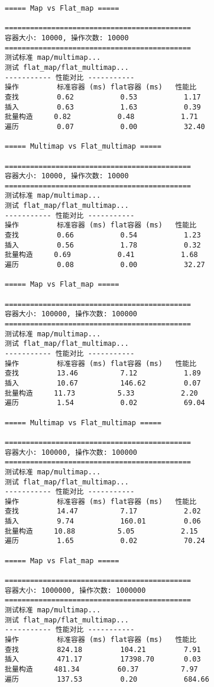 \documentclass[a4paper, 12pt]{article}
\begin{document}
\begin{lstlisting}[style=cpp]
===== Map vs Flat_map =====

============================================
容器大小: 10000, 操作次数: 10000
============================================
测试标准 map/multimap...
测试 flat_map/flat_multimap...
----------- 性能对比 -----------
操作         标准容器 (ms) flat容器 (ms)   性能比
查找         0.62           0.53           1.17
插入         0.63           1.63           0.39
批量构造     0.82           0.48           1.71
遍历         0.07           0.00           32.40

===== Multimap vs Flat_multimap =====

============================================
容器大小: 10000, 操作次数: 10000
============================================
测试标准 map/multimap...
测试 flat_map/flat_multimap...
----------- 性能对比 -----------
操作         标准容器 (ms) flat容器 (ms)   性能比
查找         0.66           0.54           1.23
插入         0.56           1.78           0.32
批量构造     0.69           0.41           1.68
遍历         0.08           0.00           32.27

===== Map vs Flat_map =====

============================================
容器大小: 100000, 操作次数: 100000
============================================
测试标准 map/multimap...
测试 flat_map/flat_multimap...
----------- 性能对比 -----------
操作         标准容器 (ms) flat容器 (ms)   性能比
查找         13.46          7.12           1.89
插入         10.67          146.62         0.07
批量构造     11.73          5.33           2.20
遍历         1.54           0.02           69.04

===== Multimap vs Flat_multimap =====

============================================
容器大小: 100000, 操作次数: 100000
============================================
测试标准 map/multimap...
测试 flat_map/flat_multimap...
----------- 性能对比 -----------
操作         标准容器 (ms) flat容器 (ms)   性能比
查找         14.47          7.17           2.02
插入         9.74           160.01         0.06
批量构造     10.88          5.05           2.15
遍历         1.65           0.02           70.24

===== Map vs Flat_map =====

============================================
容器大小: 1000000, 操作次数: 1000000
============================================
测试标准 map/multimap...
测试 flat_map/flat_multimap...
----------- 性能对比 -----------
操作         标准容器 (ms) flat容器 (ms)   性能比
查找         824.18         104.21         7.91
插入         471.17         17398.70       0.03
批量构造     481.34         60.37          7.97
遍历         137.53         0.20           684.66


\end{lstlisting}
\end{document}
